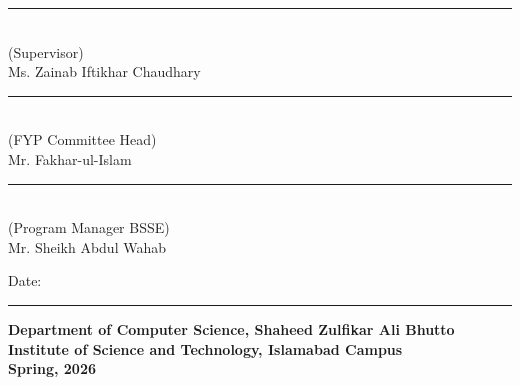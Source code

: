 \noindent
\begin{minipage}{0.48\textwidth}
\centering
\rule{6cm}{0.4pt}\\[4pt]
(Supervisor)\\
Ms. Zainab Iftikhar Chaudhary
\end{minipage}
\hfill
\begin{minipage}{0.48\textwidth}
\centering
\rule{6cm}{0.4pt}\\[4pt]
(FYP Committee Head)\\
Mr. Fakhar-ul-Islam
\end{minipage}

\vspace{1.5cm}

\begin{center}
\begin{minipage}{0.48\textwidth}
\centering
\rule{6cm}{0.4pt}\\[4pt]
(Program Manager BSSE)\\
Mr. Sheikh Abdul Wahab
\end{minipage}
\end{center}

\vspace{1cm}

\begin{center}
Date: \rule{4.5cm}{0.4pt}
\end{center}

\vfill

\begin{center}
\normalsize\textbf{Department of Computer Science, Shaheed Zulfikar Ali Bhutto Institute of Science and Technology, Islamabad Campus}\\
\vspace{6pt}
\normalsize\textbf{Spring, 2026}
\end{center}